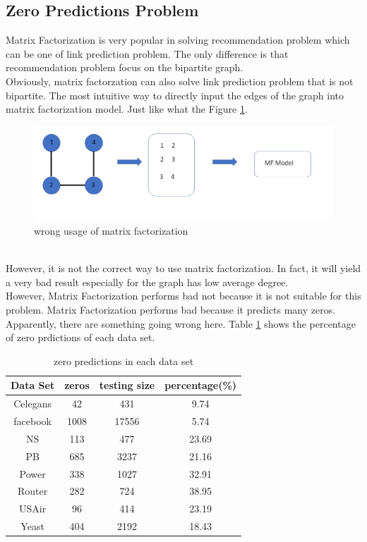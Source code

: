 \documentclass[12pt]{article}
\begin{document}
\subsection{Zero Predictions Problem}
Matrix Factorization is very popular in solving recommendation problem which can be one of link prediction problem. The only difference is that recommendation problem focus on the bipartite graph. 
\\
Obviously, matrix factorzation can also solve link prediction problem that is not bipartite. The most intuitive way to directly input the edges of the graph into matrix factorization model. Just like what the Figure \ref{fig:wrong_mf}. 
\begin{figure}[h]
	\centering
	\includegraphics[scale=0.5]{wrong_mf_example}
	\caption{wrong usage of matrix factorization}
	\label{fig:wrong_mf}
\end{figure}
\\
However, it is not the correct way to use matrix factorization. In fact, it will yield a very bad result especially for the graph has low average degree. 
\\
However, Matrix Factorization performs bad not because it is not suitable for this problem. Matrix Factorization performs bad because it predicts many zeros. Apparently, there are something going wrong here. Table \ref{tab:zero} shows the percentage of zero prdictions of each data set. 
\\
\begin{table}
	\begin{center}
		\begin{tabular}{|c|c|c|c|}
			\hline
			Data Set & zeros & testing size & percentage(\%) \\
			\hline
			Celegans&42&431&9.74 \\
			facebook&1008&17556&5.74 \\
			NS&113&477&23.69 \\
			PB&685&3237&21.16 \\
			Power&338&1027&32.91 \\
			Router&282&724&38.95 \\
			USAir&96&414&23.19 \\
			Yeast&404&2192&18.43 \\
			\hline
		\end{tabular}
	\end{center}
	\caption{zero predictions in each data set}
	\label{tab:zero}
\end{table}
\end{document}
